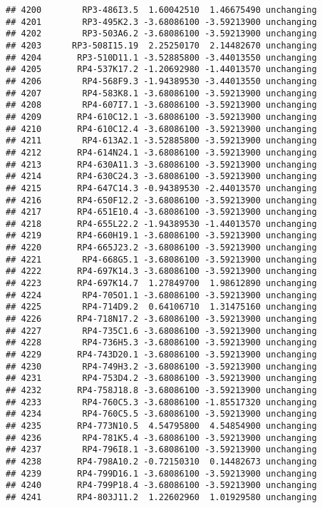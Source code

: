 \documentclass[]{article}
\begin{document}
\begin{verbatim}
## 4200        RP3-486I3.5  1.60042510  1.46675490 unchanging
## 4201        RP3-495K2.3 -3.68086100 -3.59213900 unchanging
## 4202        RP3-503A6.2 -3.68086100 -3.59213900 unchanging
## 4203      RP3-508I15.19  2.25250170  2.14482670 unchanging
## 4204       RP3-510D11.1 -3.52885800 -3.44013550 unchanging
## 4205       RP4-537K17.2 -1.20692980 -1.44013570 unchanging
## 4206        RP4-568F9.3 -1.94389530 -3.44013550 unchanging
## 4207        RP4-583K8.1 -3.68086100 -3.59213900 unchanging
## 4208        RP4-607I7.1 -3.68086100 -3.59213900 unchanging
## 4209       RP4-610C12.1 -3.68086100 -3.59213900 unchanging
## 4210       RP4-610C12.4 -3.68086100 -3.59213900 unchanging
## 4211        RP4-613A2.1 -3.52885800 -3.59213900 unchanging
## 4212       RP4-614N24.1 -3.68086100 -3.59213900 unchanging
## 4213       RP4-630A11.3 -3.68086100 -3.59213900 unchanging
## 4214       RP4-630C24.3 -3.68086100 -3.59213900 unchanging
## 4215       RP4-647C14.3 -0.94389530 -2.44013570 unchanging
## 4216       RP4-650F12.2 -3.68086100 -3.59213900 unchanging
## 4217       RP4-651E10.4 -3.68086100 -3.59213900 unchanging
## 4218       RP4-655L22.2 -1.94389530 -1.44013570 unchanging
## 4219       RP4-660H19.1 -3.68086100 -3.59213900 unchanging
## 4220       RP4-665J23.2 -3.68086100 -3.59213900 unchanging
## 4221        RP4-668G5.1 -3.68086100 -3.59213900 unchanging
## 4222       RP4-697K14.3 -3.68086100 -3.59213900 unchanging
## 4223       RP4-697K14.7  1.27849700  1.98612890 unchanging
## 4224        RP4-705O1.1 -3.68086100 -3.59213900 unchanging
## 4225        RP4-714D9.2  0.64106710  1.31475160 unchanging
## 4226       RP4-718N17.2 -3.68086100 -3.59213900 unchanging
## 4227        RP4-735C1.6 -3.68086100 -3.59213900 unchanging
## 4228        RP4-736H5.3 -3.68086100 -3.59213900 unchanging
## 4229       RP4-743D20.1 -3.68086100 -3.59213900 unchanging
## 4230        RP4-749H3.2 -3.68086100 -3.59213900 unchanging
## 4231        RP4-753D4.2 -3.68086100 -3.59213900 unchanging
## 4232       RP4-758J18.8 -3.68086100 -3.59213900 unchanging
## 4233        RP4-760C5.3 -3.68086100 -1.85517320 unchanging
## 4234        RP4-760C5.5 -3.68086100 -3.59213900 unchanging
## 4235       RP4-773N10.5  4.54795800  4.54854900 unchanging
## 4236        RP4-781K5.4 -3.68086100 -3.59213900 unchanging
## 4237        RP4-796I8.1 -3.68086100 -3.59213900 unchanging
## 4238       RP4-798A10.2 -0.72150310  0.14482673 unchanging
## 4239       RP4-799D16.1 -3.68086100 -3.59213900 unchanging
## 4240       RP4-799P18.4 -3.68086100 -3.59213900 unchanging
## 4241       RP4-803J11.2  1.22602960  1.01929580 unchanging

\end{verbatim}
\end{document}
